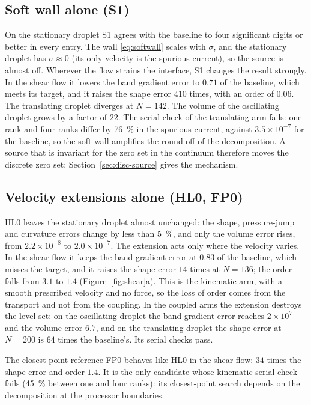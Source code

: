 \documentclass[preprint,3p,11pt]{elsarticle}
\begin{document}
\subsection{Soft wall alone (S1)}
\label{sec:res-s1}
On the stationary droplet S1 agrees with the baseline to four significant digits or
better in every entry. The wall \eqref{eq:softwall} scales with $\sigma$, and the
stationary droplet has $\sigma\approx0$ (its only velocity is the spurious current), so
the source is almost off. Wherever the flow strains the interface, S1
changes the result strongly. In the shear flow it lowers the band gradient error to
$0.71$ of the baseline, which meets its target, and it raises the shape error $410$
times, with an order of $0.06$. The translating droplet diverges at $N=142$. The volume of
the oscillating droplet grows by a factor of $22$. The serial check of the translating
arm fails: one rank and four ranks differ by \SI{76}{\percent} in the spurious current,
against $3.5\times10^{-7}$ for the baseline, so the soft wall amplifies the round-off of
the decomposition. A source that is invariant for the zero set in the continuum
therefore moves the discrete zero set; Section~\ref{sec:disc-source} gives the mechanism.

\subsection{Velocity extensions alone (HL0, FP0)}
\label{sec:res-hl0}
HL0 leaves the stationary droplet almost unchanged: the shape, pressure-jump and
curvature errors change by less than \SI{5}{\percent}, and only the volume error rises,
from $2.2\times10^{-8}$ to $2.0\times10^{-7}$. The extension acts only where the velocity
varies. In the shear flow it keeps the band gradient error at $0.83$ of the
baseline, which misses the target, and it raises the shape error $14$ times at
$N=136$; the order falls from $3.1$ to $1.4$ (Figure~\ref{fig:shear}a). This is the
kinematic arm, with a smooth prescribed velocity and no force, so the loss of order
comes from the transport and not from the coupling. In the coupled arms the extension
destroys the level set: on the oscillating droplet the band gradient error reaches
$2\times10^{7}$ and the volume error $6.7$, and on the translating droplet the shape
error at $N=200$ is $64$ times the baseline's. Its serial checks pass.

The closest-point reference FP0 behaves like HL0 in the shear flow: $34$ times the shape
error and order $1.4$. It is the only candidate whose kinematic serial check fails
(\SI{45}{\percent} between one and four ranks): its closest-point search depends on the
decomposition at the processor boundaries.
\end{document}
